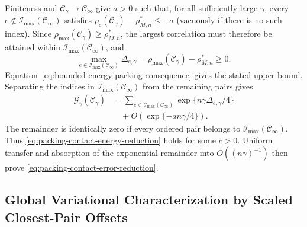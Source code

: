 \documentclass[12pt,draftclsnofoot,onecolumn]{IEEEtran}
\newcommand{\cC}{\mathcal{C}}
\newcommand{\cG}{\mathcal{G}}
\newcommand{\cI}{\mathcal{I}}
\theoremstyle{definition}
\begin{document}
\begin{IEEEproof}
Finiteness and \(\cC_\gamma\to\cC_\infty\) give \(a>0\) such that,
for all sufficiently large \(\gamma\), every
\(e\notin\cI_{\max}(\cC_\infty)\) satisfies
\(\rho_e(\cC_\gamma)-\rho^{\ast}_{M,n}\le-a\) (vacuously if there is
no such index).  Since \(\rho_{\max}(\cC_\gamma)\ge\rho^{\ast}_{M,n}\),
the largest correlation must therefore be attained within
\(\cI_{\max}(\cC_\infty)\), and
\begin{equation*}
  \max_{e\in\cI_{\max}(\cC_\infty)}\Delta_{e,\gamma}
  =\rho_{\max}(\cC_\gamma)-\rho^{\ast}_{M,n}\ge0.
\end{equation*}
Equation~\eqref{eq:bounded-energy-packing-consequence} gives the stated
upper bound.  Separating the indices in
\(\cI_{\max}(\cC_\infty)\) from the remaining pairs gives
\begin{equation*}
\begin{split}
  \cG_\gamma(\cC_\gamma)
  &={}
  \sum_{e\in\cI_{\max}(\cC_\infty)}
  \exp\{n\gamma\Delta_{e,\gamma}/4\}\\
  &\quad+O(\exp\{-a n\gamma/4\}).
\end{split}
\end{equation*}
The remainder is identically zero if every ordered pair belongs to
\(\cI_{\max}(\cC_\infty)\).  Thus
\eqref{eq:packing-contact-energy-reduction} holds for some \(c>0\).
Uniform transfer and absorption of the exponential remainder into
\(O((n\gamma)^{-1})\) then prove
\eqref{eq:packing-contact-error-reduction}.
\end{IEEEproof}

\subsection{Global Variational Characterization by Scaled Closest-Pair Offsets}
\end{document}
